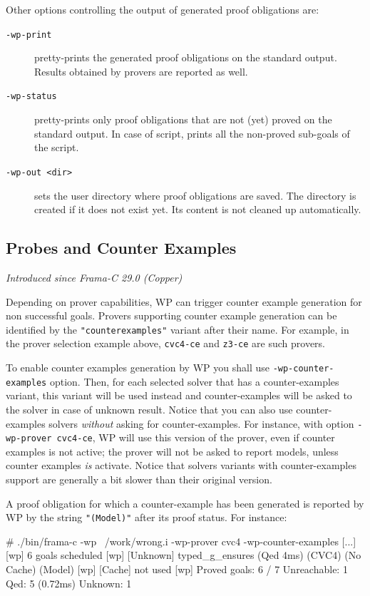 Other options controlling the output of generated proof
obligations are:
\begin{description}
\item[\tt -wp-print] pretty-prints the generated proof obligations on
  the standard output. Results obtained by provers are reported as
  well.
\item[\tt -wp-status] pretty-prints only proof obligations that are not (yet)
  proved on the standard output. In case of script, prints all the non-proved
  sub-goals of the script.
\item[\tt -wp-out <dir>] sets the user directory where proof
  obligations are saved. The directory is created if it does not exist
  yet. Its content is not cleaned up automatically.
\end{description}

\subsection{Probes and Counter Examples}

\emph{Introduced since Frama-C 29.0 (Copper)}

Depending on prover capabilities, \textsf{WP} can trigger counter example
generation for non successful goals. Provers supporting counter example
generation can be identified by the \verb$"counterexamples"$ variant after their
name. For example, in the prover selection example above, \verb+cvc4-ce+ and
\verb+z3-ce+ are such provers.

To enable counter examples generation by \textsf{WP} you shall use
\verb+-wp-counter-examples+ option. Then, for each selected solver that has a
counter-examples variant, this variant will be used instead and counter-examples
will be asked to the solver in case of unknown result. Notice that you can also
use counter-examples solvers \emph{without} asking for counter-examples. For
instance, with option \verb+-wp-prover cvc4-ce+, \textsf{WP} will use this
version of the prover, even if counter examples is not active; the prover will
not be asked to report models, unless counter examples \emph{is}
activate. Notice that solvers variants with counter-examples support are
generally a bit slower than their original version.

A proof obligation for which a counter-example has been generated is reported by
\textsf{WP} by the string \verb+"(Model)"+ after its proof status. For instance:

\begin{shell}
# ./bin/frama-c -wp ~/work/wrong.i -wp-prover cvc4 -wp-counter-examples
[...]
[wp] 6 goals scheduled
[wp] [Unknown] typed_g_ensures (Qed 4ms) (CVC4) (No Cache) (Model)
[wp] [Cache] not used
[wp] Proved goals:    6 / 7
  Unreachable:     1
  Qed:             5 (0.72ms)
  Unknown:         1
\end{shell}


